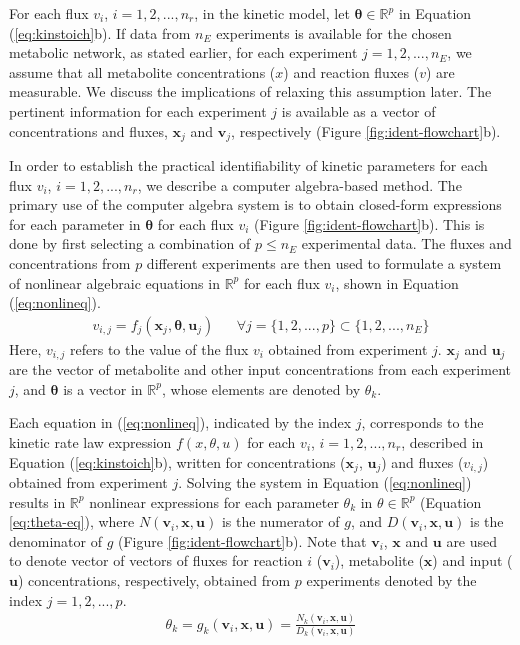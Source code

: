 \documentclass[10pt]{article}
\begin{document}
	For each flux $v_i$, $i={1, 2, ..., n_r}$, in the kinetic model, let $\mathbf{\theta} \in \mathbb{R}^p$ in Equation (\ref{eq:kinstoich}b). If data from $n_E$ experiments is available for the chosen metabolic network, as stated earlier, for each experiment $j = {1, 2, ..., n_E}$, we assume that all metabolite concentrations ($x$) and reaction fluxes ($v$) are measurable. We discuss the implications of relaxing this assumption later. The pertinent information for each experiment $j$ is available as a vector of concentrations and fluxes, $\mathbf{x}_j$ and $\mathbf{v}_j$, respectively (Figure \ref{fig:ident-flowchart}b). 
	
	In order to establish the practical identifiability of kinetic parameters for each flux $v_i$, $i={1, 2, ..., n_r}$, we describe a computer algebra-based method. The primary use of the computer algebra system is to obtain closed-form expressions for each parameter in $\mathbf{\theta}$ for each flux $v_i$ (Figure \ref{fig:ident-flowchart}b). This is done by first selecting a combination of $p\le n_E$ experimental data. The fluxes and concentrations from $p$ different experiments are then used to formulate a system of nonlinear algebraic equations in $\mathbb{R}^p$ for each flux $v_i$, shown in Equation (\ref{eq:nonlineq}). 
	\begin{align}\label{eq:nonlineq}
	v_{i, j} = f_j(\mathbf{x}_j,\mathbf{\theta}, \mathbf{u}_j) && \forall j=\{1, 2, ..., p\}\subset\{1, 2, ..., n_E\}
	\end{align}
	Here, $v_{i,j}$ refers to the value of the flux $v_i$ obtained from experiment $j$. $\mathbf{x}_j$ and $\mathbf{u}_j$ are the vector of metabolite and other input concentrations from each experiment $j$, and $\mathbf{\theta}$ is a vector in $\mathbb{R}^p$, whose elements are denoted by $\theta_k$.		
	
	Each equation in (\ref{eq:nonlineq}), indicated by the index $j$, corresponds to the kinetic rate law expression $f(x, \theta, u)$ for each $v_i$, $i={1, 2, ..., n_r}$, described in Equation (\ref{eq:kinstoich}b), written for concentrations ($\mathbf{x}_j$, $\mathbf{u}_j$) and fluxes ($v_{i,j}$) obtained from experiment $j$. Solving the system in Equation (\ref{eq:nonlineq}) results in $\mathbb{R}^p$ nonlinear expressions for each parameter $\theta_k$ in $\theta \in \mathbb{R}^p$ (Equation \ref{eq:theta-eq}), where $N(\mathbf{v}_i, \mathbf{x}, \mathbf{u})$ is the numerator of $g$, and $D(\mathbf{v}_i, \mathbf{x}, \mathbf{u})$ is the denominator of $g$ (Figure \ref{fig:ident-flowchart}b). Note that $\mathbf{v}_i$, $\mathbf{x}$ and $\mathbf{u}$ are used to denote vector of vectors of fluxes for reaction $i$ ($\mathbf{v}_i$), metabolite ($\mathbf{x}$) and input ($\mathbf{u}$) concentrations, respectively, obtained from $p$ experiments denoted by the index $j = {1, 2, ..., p}$.
	\begin{align}\label{eq:theta-eq}
	\theta_k = g_k(\mathbf{v}_i, \mathbf{x}, \mathbf{u}) = \frac{N_k(\mathbf{v}_i, \mathbf{x}, \mathbf{u})}{D_k(\mathbf{v}_i, \mathbf{x}, \mathbf{u})}
	\end{align}
\end{document}
